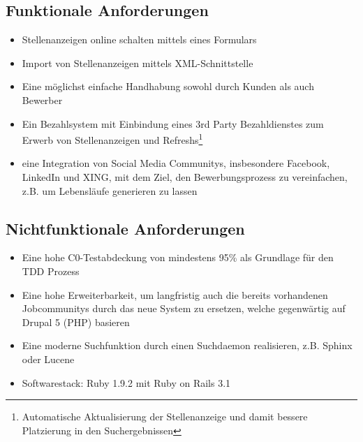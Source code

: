 \subsection{Funktionale Anforderungen}
\begin{itemize}
 \item Stellenanzeigen online schalten mittels eines Formulars
 \item Import von Stellenanzeigen mittels XML-Schnittstelle
 \item Eine möglichst einfache Handhabung sowohl durch Kunden als auch Bewerber
 \item Ein Bezahlsystem mit Einbindung eines 3rd Party Bezahldienstes zum Erwerb von Stellenanzeigen und Refreshs\footnote{Automatische Aktualisierung der Stellenanzeige und damit bessere Platzierung in den Suchergebnissen}
 \item eine Integration von Social Media Communitys, insbesondere Facebook, LinkedIn und XING, mit dem Ziel, den Bewerbungsprozess zu vereinfachen, z.B. um Lebensläufe generieren zu lassen
\end{itemize}

\subsection{Nichtfunktionale Anforderungen}

\begin{itemize}
 \item Eine hohe C0-Testabdeckung von mindestens 95\% als Grundlage für den TDD Prozess
 \item Eine hohe Erweiterbarkeit, um langfristig auch die bereits vorhandenen Jobcommunitys durch das neue System zu ersetzen, welche gegenwärtig auf Drupal 5 (PHP) basieren
 \item Eine moderne Suchfunktion durch einen Suchdaemon realisieren, z.B. Sphinx oder Lucene
 \item Softwarestack: Ruby 1.9.2 mit Ruby on Rails 3.1
\end{itemize}

